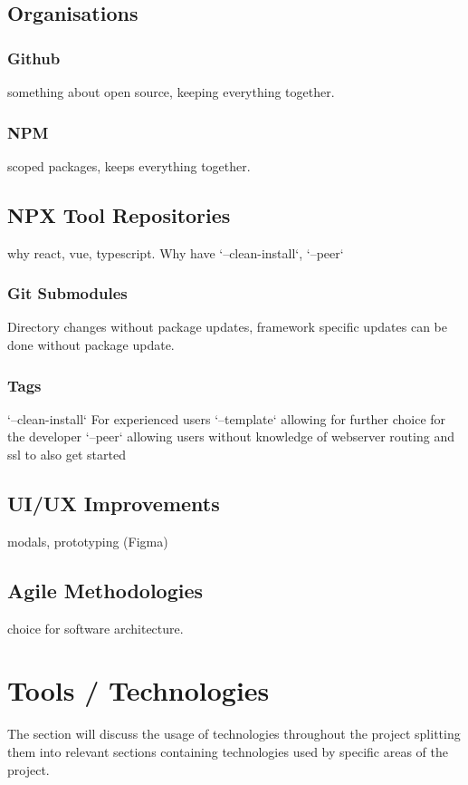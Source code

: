 \documentclass{l4proj}
\begin{document}
\section{Organisations}
\subsection{Github}
\text something about open source, keeping everything together.
\subsection{NPM}
\text scoped packages, keeps everything together.
\section{NPX Tool Repositories}
\text why react, vue, typescript. Why have `--clean-install`, `--peer`
\subsection{Git Submodules}
\text Directory changes without package updates, framework specific updates can be done without package update.
\subsection{Tags}
\text `--clean-install` For experienced users `--template` allowing for further choice for the developer `--peer` allowing users without knowledge of webserver routing and ssl to also get started
\section{UI/UX Improvements}
\text modals, prototyping (Figma)
\section{Agile Methodologies}
\text choice for software architecture.
\chapter{Tools / Technologies}

The section will discuss the usage of technologies throughout the project splitting them into relevant sections containing technologies used by specific areas of the project.
\end{document}
